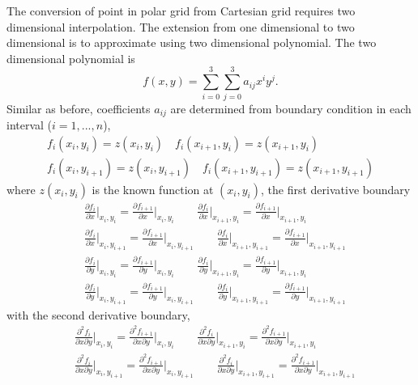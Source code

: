 The conversion of point in polar grid from Cartesian grid requires two dimensional interpolation. The extension from one dimensional to two dimensional is to approximate using two dimensional polynomial. The two dimensional polynomial is
\begin{equation}
f(x,y)=\sum_{i=0}^{3} \sum_{j=0}^{3} a_{ij} x^{i} y^{j}.
\label{eq:spline2d}
\end{equation}
Similar as before, coefficients $a_{ij}$ are determined from boundary condition in each interval ($i=1,...,n$),
\begin{align}
 f_{i}(x_i,y_i)=z(x_i,y_i) \quad  f_{i}(x_{i+1},y_i)=z(x_{i+1},y_i)  \\
 f_{i}(x_i,y_{i+1})=z(x_i,y_{i+1}) \quad  f_{i}(x_{i+1},y_{i+1})=z(x_{i+1},y_{i+1}) 
\end{align}
where $z(x_i,y_i)$ is the known function at $(x_i,y_i)$, the first derivative boundary
\begin{align}
&\frac{\partial f_{i}}{\partial x}\Bigr|_{x_i,y_i}=\frac{\partial f_{i+1}}{\partial x}\Bigr|_{x_i,y_i} \qquad 
\frac{\partial f_{i}}{\partial x}\Bigr|_{x_{i+1},y_i}=\frac{\partial f_{i+1}}{\partial x}\Bigr|_{x_{i+1},y_i} \\
&\frac{\partial f_{i}}{\partial x}\Bigr|_{x_i,y_{i+1}}=\frac{\partial f_{i+1}}{\partial x}\Bigr|_{x_i,y_{i+1}} \qquad 
\frac{\partial f_{i}}{\partial x}\Bigr|_{x_{i+1},y_{i+1}}=\frac{\partial f_{i+1}}{\partial x}\Bigr|_{x_{i+1},y_{i+1}} \\
&\frac{\partial f_{i}}{\partial y}\Bigr|_{x_i,y_i}=\frac{\partial f_{i+1}}{\partial y}\Bigr|_{x_i,y_i} \qquad 
\frac{\partial f_{i}}{\partial y}\Bigr|_{x_{i+1},y_i}=\frac{\partial f_{i+1}}{\partial y}\Bigr|_{x_{i+1},y_i} \\
&\frac{\partial f_{i}}{\partial y}\Bigr|_{x_i,y_{i+1}}=\frac{\partial f_{i+1}}{\partial y}\Bigr|_{x_i,y_{i+1}} \qquad 
\frac{\partial f_{i}}{\partial y}\Bigr|_{x_{i+1},y_{i+1}}=\frac{\partial f_{i+1}}{\partial y}\Bigr|_{x_{i+1},y_{i+1}} 
\end{align}
with the second derivative boundary,
\begin{align}
&\frac{\partial^2 f_{i}}{\partial x\partial y}\Bigr|_{x_i,y_i}=\frac{\partial^2 f_{i+1}}{\partial x \partial y}\Bigr|_{x_i,y_i} \qquad 
\frac{\partial^2 f_{i}}{\partial x\partial y}\Bigr|_{x_{i+1},y_i}=\frac{\partial^2 f_{i+1}}{\partial x \partial y}\Bigr|_{x_{i+1},y_i} \\
&\frac{\partial^2 f_{i}}{\partial x \partial y}\Bigr|_{x_i,y_{i+1}}=\frac{\partial^2 f_{i+1}}{\partial x \partial y}\Bigr|_{x_i,y_{i+1}} \qquad 
\frac{\partial^2 f_{i}}{\partial x \partial y}\Bigr|_{x_{i+1},y_{i+1}}=\frac{\partial^2 f_{i+1}}{\partial x \partial y}\Bigr|_{x_{i+1},y_{i+1}} \\
\end{align}


